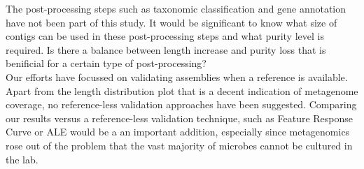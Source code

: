 \documentclass[a4paper,12pt]{report}
\begin{document}
The post-processing steps such as taxonomic classification and gene annotation
have not been part of this study. It would be significant to know what size of
contigs can be used in these post-processing steps and what purity level is
required. Is there a balance between length increase and purity loss that is
benificial for a certain type of post-processing?\\


Our efforts have focussed on validating assemblies when a reference is
available. Apart from the length distribution plot that is a decent indication
of metagenome coverage, no reference-less validation approaches have been
suggested. Comparing our results versus a reference-less validation technique,
such as Feature Response Curve \cite{TODO} or ALE \cite{TODO} would be a an
important addition, especially since metagenomics rose out of the problem that
the vast majority of microbes cannot be cultured in the lab.


\end{document}

